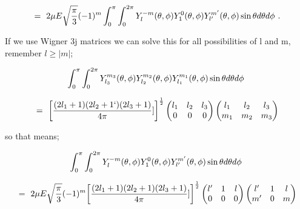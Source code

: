 \documentclass{article}
\begin{document}
\begin{equation} \label{eq:261}
= \hspace{0.125cm} 2 \mu E \sqrt{\frac{\pi}{3}} (-1)^{m} \int_{0}^{\pi} \int_{0}^{2\pi} Y_{l}^{-m}(\theta, \phi) Y_{1}^{0}(\theta, \phi) Y_{l'}^{m'}(\theta, \phi) \sin\theta d\theta d\phi \hspace{0.125cm} . 
\end{equation}

If we use Wigner 3j matrices we can solve this for all possibilities of l and m, remember \begin{math} l \ge \big| m \big| \end{math};

\begin{equation} \label{eq:262}
\int_{0}^{\pi} \int_{0}^{2\pi} Y_{l_{3}}^{m_{3}}(\theta, \phi) Y_{l_{2}}^{m_{2}}(\theta, \phi) Y_{l_{1}}^{m_{1}}(\theta, \phi) \sin\theta d\theta d\phi \hspace{0.125cm} 
\end{equation}

\begin{equation} \label{eq:263}
= \hspace{0.125cm} \bigg[\frac{(2 l_1 + 1)(2 l_2 + 1`)(2 l_3 + 1)}{4\pi}]\bigg]^{\frac{1}{2}}\begin{pmatrix} l_1 & l_2 & l_3 \\ 0 & 0 & 0 \end{pmatrix}\begin{pmatrix} l_1 & l_2 & l_3 \\ m_1 & m_2 & m_3 \end{pmatrix}
\end{equation}

so that means;

\begin{equation} \label{eq:264}
\int_{0}^{\pi} \int_{0}^{2\pi} Y_{l}^{-m}(\theta, \phi) Y_{1}^{0}(\theta, \phi) Y_{l'}^{m'}(\theta, \phi) \sin\theta d\theta d\phi \hspace{0.125cm} 
\end{equation}

\begin{equation} \label{eq:265}
= \hspace{0.125cm} 2 \mu E \sqrt{\frac{\pi}{3}} (-1)^{m} \bigg[\frac{(2 l_1 + 1)(2 l_2 + 1)(2 l_3 + 1)}{4\pi}]\bigg]^{\frac{1}{2}}\begin{pmatrix} l' & 1 & l \\ 0 & 0 & 0 \end{pmatrix}\begin{pmatrix} l' & 1 & l \\ m' & 0 & m \end{pmatrix}
\end{equation}
\end{document}
